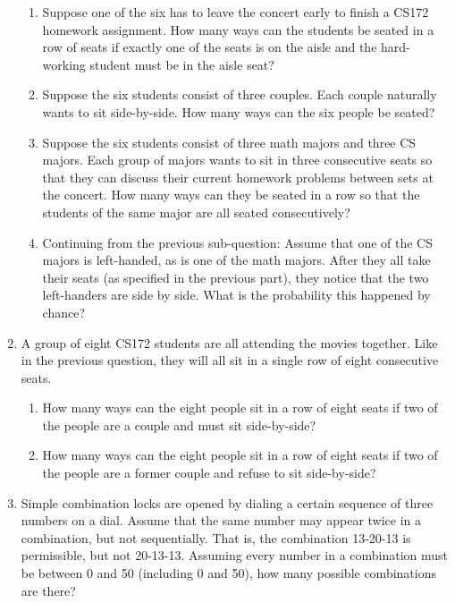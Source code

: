 \documentclass[11pt, letterpaper]{report}
\begin{document}
\begin{enumerate}
\begin{enumerate}
\item Suppose one of the six has to leave the concert early to finish a CS172 homework
assignment. How many ways can the students be seated in a row of seats if exactly one of the seats is on the aisle and the hard-working  student must be in the aisle seat?

\item Suppose the six students consist of three couples.  Each couple naturally wants to
sit side-by-side.  How many ways can the six people be seated?

\item Suppose the six students consist of three math majors and three CS majors. Each group of majors wants to sit in three consecutive seats so that they can discuss their current homework problems between sets at the concert. How many ways can they be seated in a row so that the students of the same major are all seated consecutively?

\item Continuing from the previous sub-question: Assume that one of the CS majors is left-handed, as is one of the math majors.  After they all take their seats (as specified in the
previous part), they notice that the two left-handers are side by side.  What is the probability this happened by chance?
\end{enumerate}

\item A group of eight CS172 students are all attending the movies together.  Like in the previous question, they will all sit
in a single row of eight consecutive seats.

\begin{enumerate}
\item How many ways can the eight people sit in a row of eight seats if two of the people are a couple
and must sit side-by-side? 


\item How many ways can the eight people sit in a row of eight seats if two of the people
are a former couple and refuse to sit side-by-side?

\end{enumerate}


\item Simple combination locks are opened by dialing a certain sequence of three numbers on a dial.  Assume that the same number may appear twice in a combination, but not sequentially.
That is, the combination 13-20-13 is permissible, but not 20-13-13.  Assuming every number
in a combination must be between 0 and 50 (including 0 and 50), how many possible combinations are there?


\end{enumerate}
\end{document}
